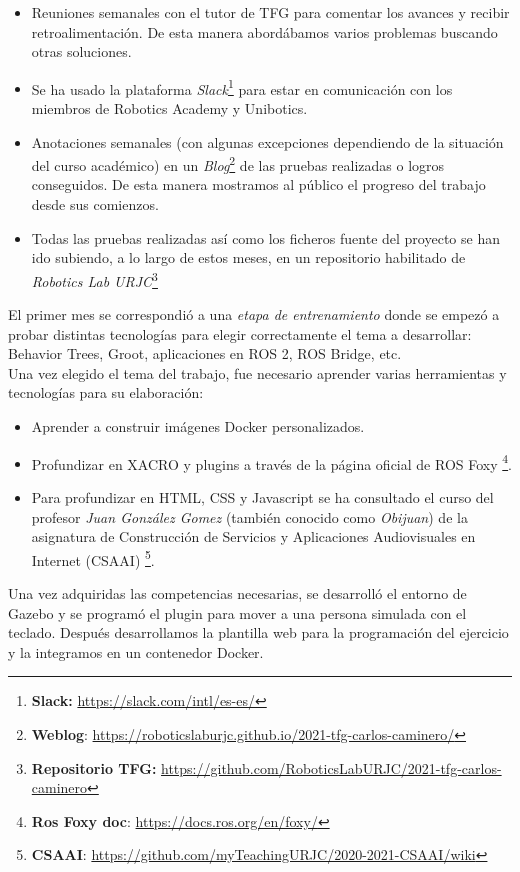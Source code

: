 \begin{itemize}
	\item Reuniones semanales con el tutor de TFG para comentar los avances y recibir retroalimentación. De esta manera abordábamos varios problemas buscando otras soluciones.
	\item Se ha usado la plataforma \textit{Slack}\footnote{\textbf{Slack:} \url{https://slack.com/intl/es-es/}} para estar en comunicación con los miembros de Robotics Academy y Unibotics.
	\item Anotaciones semanales (con algunas excepciones dependiendo de la situación del curso académico) en un \textit{Blog}\footnote{\textbf{Weblog}: \url{https://roboticslaburjc.github.io/2021-tfg-carlos-caminero/}} de las pruebas realizadas o logros conseguidos. De esta manera mostramos al público el progreso del trabajo desde sus comienzos.
	\item Todas las pruebas realizadas así como los ficheros fuente del proyecto se han ido subiendo, a lo largo de estos meses, en un repositorio habilitado de \textit{Robotics Lab URJC}\footnote{\textbf{Repositorio TFG:} \url{https://github.com/RoboticsLabURJC/2021-tfg-carlos-caminero}}
\end{itemize}

El primer mes se correspondió a una \textit{etapa de entrenamiento} donde se empezó a probar distintas tecnologías para elegir correctamente el tema a desarrollar: Behavior Trees, Groot, aplicaciones en ROS 2, ROS Bridge, etc.\\

Una vez elegido el tema del trabajo, fue necesario aprender varias herramientas y tecnologías para su elaboración:
\begin{itemize}
	\item Aprender a construir imágenes Docker personalizados.
	\item Profundizar en XACRO y plugins a través de la página oficial de ROS Foxy \footnote{\textbf{Ros Foxy doc}: \url{https://docs.ros.org/en/foxy/}}.
	\item Para profundizar en HTML, CSS y Javascript se ha consultado el curso del profesor \textit{Juan González Gomez} (también conocido como \textit{Obijuan}) de la asignatura de Construcción de Servicios y Aplicaciones Audiovisuales en Internet (CSAAI) \footnote{\textbf{CSAAI}: \url{https://github.com/myTeachingURJC/2020-2021-CSAAI/wiki}}.
\end{itemize}

Una vez adquiridas las competencias necesarias, se desarrolló el entorno de Gazebo y se programó el plugin para mover a una persona simulada con el teclado. Después desarrollamos la plantilla web para la programación del ejercicio y la integramos en un contenedor Docker.\\

